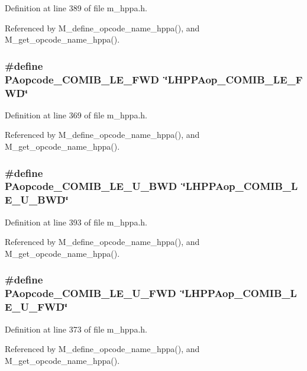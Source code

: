Definition at line 389 of file m\_\-hppa.h.

Referenced by M\_\-define\_\-opcode\_\-name\_\-hppa(), and M\_\-get\_\-opcode\_\-name\_\-hppa().
\subsubsection{\setlength{\rightskip}{0pt plus 5cm}\#define PAopcode\_\-COMIB\_\-LE\_\-FWD~\char`\"{}LHPPAop\_\-COMIB\_\-LE\_\-FWD\char`\"{}}\label{m__hppa_8h_162c924a1b3b116a2be490f369c35ec3}




Definition at line 369 of file m\_\-hppa.h.

Referenced by M\_\-define\_\-opcode\_\-name\_\-hppa(), and M\_\-get\_\-opcode\_\-name\_\-hppa().
\subsubsection{\setlength{\rightskip}{0pt plus 5cm}\#define PAopcode\_\-COMIB\_\-LE\_\-U\_\-BWD~\char`\"{}LHPPAop\_\-COMIB\_\-LE\_\-U\_\-BWD\char`\"{}}\label{m__hppa_8h_436814865dd97c42e742bfb469245016}




Definition at line 393 of file m\_\-hppa.h.

Referenced by M\_\-define\_\-opcode\_\-name\_\-hppa(), and M\_\-get\_\-opcode\_\-name\_\-hppa().
\subsubsection{\setlength{\rightskip}{0pt plus 5cm}\#define PAopcode\_\-COMIB\_\-LE\_\-U\_\-FWD~\char`\"{}LHPPAop\_\-COMIB\_\-LE\_\-U\_\-FWD\char`\"{}}\label{m__hppa_8h_5a7e6b2a538b60b900cf7f2ba5e01586}




Definition at line 373 of file m\_\-hppa.h.

Referenced by M\_\-define\_\-opcode\_\-name\_\-hppa(), and M\_\-get\_\-opcode\_\-name\_\-hppa().
